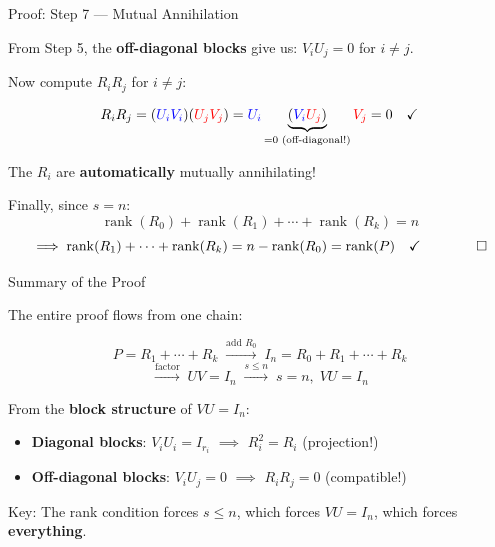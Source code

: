 \documentclass[10pt]{beamer}
\theoremstyle{definition}
\newcommand{\x}[1]{\alert{\textbf{#1}}}
\newcommand{\rd}[1]{{\color{red}#1}}                  %
\newcommand{\bl}[1]{{\color{blue}#1}}                 %
\begin{document}
\begin{frame}{Proof: Step 7 --- Mutual Annihilation}

From Step 5, the \x{off-diagonal blocks} give us: $V_i U_j = 0$ for $i \neq j$.

\vspace{0.5em}

Now compute $R_i R_j$ for $i \neq j$:

$$R_i R_j = (\bl{U_i} \bl{V_i})(\rd{U_j} \rd{V_j}) = \bl{U_i} \underbrace{(\bl{V_i} \rd{U_j})}_{= 0 \text{ (off-diagonal!)}} \rd{V_j} = 0 \quad \checkmark$$

\vspace{0.5em}

The $R_i$ are \x{automatically} mutually annihilating!

\vspace{0.5em}

Finally, since $s = n$:
$$\operatorname{rank}(R_0) + \operatorname{rank}(R_1) + \cdots + \operatorname{rank}(R_k) = n$$
$$\implies \operatorname{rank}(R_1) + \cdots + \operatorname{rank}(R_k) = n - \operatorname{rank}(R_0) = \operatorname{rank}(P) \quad \checkmark \qquad \qed$$

\end{frame}


\begin{frame}{Summary of the Proof}

The entire proof flows from one chain:

$$P = R_1 + \cdots + R_k \;\xrightarrow{\text{add } R_0}\; I_n = R_0 + R_1 + \cdots + R_k$$
$$\xrightarrow{\text{factor}}\; UV = I_n \;\xrightarrow{s \leq n}\; s = n, \; VU = I_n$$

\vspace{0.3em}

From the \x{block structure} of $VU = I_n$:
\begin{itemize}
\item \x{Diagonal blocks}: $V_i U_i = I_{r_i}$ $\implies$ $R_i^2 = R_i$ (projection!)
\item \x{Off-diagonal blocks}: $V_i U_j = 0$ $\implies$ $R_i R_j = 0$ (compatible!)
\end{itemize}

\vspace{0.5em}

Key: The rank condition forces $s \leq n$, which forces $VU = I_n$, which forces \x{everything}.

\end{frame}
\end{document}
